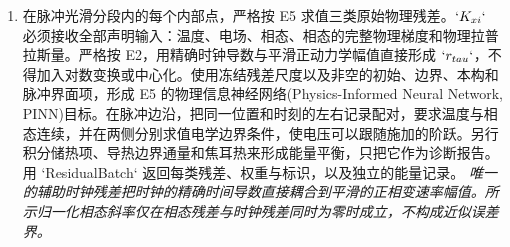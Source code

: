 \documentclass[10pt,a4paper]{article}
\begin{document}
\begin{enumerate}[leftmargin=*,start=3]
\noindent\emph{先构造完整物理空间 Hessian，包括两项混合缩并、时钟梯度外积和时钟 Hessian，再取迹或散度；Hessian 与 Laplacian 不混用。}
\par{}
\par\emph{为什么：} 只有以正确张量形状保留所有诱导的链式法则项，空间相关的时间坐标才会保持声明的 PDE。脉冲跳变作为界面处理，不对跳变本身求导。
  \item 在脉冲光滑分段内的每个内部点，严格按 E5 求值三类原始物理残差。\(`K_{xi}`\) 必须接收全部声明输入：温度、电场、相态、相态的完整物理梯度和物理拉普拉斯量。严格按 E2，用精确时钟导数与平滑正动力学幅值直接形成 \(`r_{tau}`\)，不得加入对数变换或中心化。使用冻结残差尺度以及非空的初始、边界、本构和脉冲界面项，形成 E5 的物理信息神经网络(Physics-Informed Neural Network, PINN)目标。在脉冲边沿，把同一位置和时刻的左右记录配对，要求温度与相态连续，并在两侧分别求值电学边界条件，使电压可以跟随施加的阶跃。另行积分储热项、导热边界通量和焦耳热来形成能量平衡，只把它作为诊断报告。用 `ResidualBatch` 返回每类残差、权重与标识，以及独立的能量记录。
\noindent\emph{唯一的辅助时钟残差把时钟的精确时间导数直接耦合到平滑的正相变速率幅值。所示归一化相态斜率仅在相态残差与时钟残差同时为零时成立，不构成近似误差界。}
\par{}

\end{enumerate}
\end{document}
